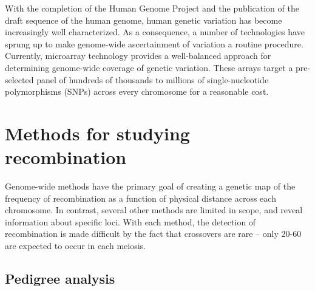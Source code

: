 With the completion of the Human Genome Project and the publication of the draft sequence of the human genome\cite{Venter2001,Lander2001}, human genetic variation has become increasingly well characterized.
As a consequence, a number of technologies have sprung up to make genome-wide ascertainment of variation a routine procedure.
Currently, microarray technology provides a well-balanced approach for determining genome-wide coverage of genetic variation.
These arrays target a pre-selected panel of hundreds of thousands to millions of single-nucleotide polymorphisms (SNPs) across every chromosome for a reasonable cost.

\section{Methods for studying recombination}

Genome-wide methods have the primary goal of creating a genetic map of the frequency of recombination as a function of physical distance across each chromosome.
In contrast, several other methods are limited in scope, and reveal information about specific loci.
With each method, the detection of recombination is made difficult by the fact that crossovers are rare -- only 20-60 are expected to occur in each meiosis.


\subsection{Pedigree analysis}

